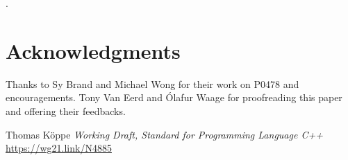 \documentclass{wg21}
\begin{document}
.


\section{Acknowledgments}

Thanks to Sy Brand and Michael Wong for their work on P0478 and encouragements.
Tony Van Eerd and Ólafur Waage for proofreading this paper and offering their feedbacks.






\renewcommand{\section}[2]{}%
\begin{thebibliography}{9}

    Thomas Köppe
    \emph{Working Draft, Standard for Programming Language C++}\newline
    \url{https://wg21.link/N4885}

\end{thebibliography}
\end{document}
